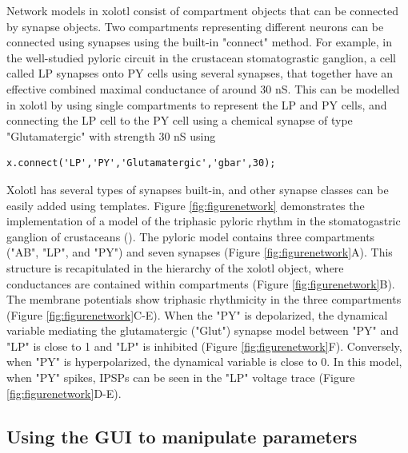 \documentclass{frontiersSCNS} %
\begin{document}
\begin{tcolorbox}[breakable,notitle,boxrule=0pt,colback=yellow,colframe=yellow]

Network models in xolotl consist of compartment objects that can be connected by synapse objects. Two compartments representing different neurons can be connected using synapses using the built-in "connect" method. For example, in the well-studied pyloric circuit in the crustacean stomatograstic ganglion, a cell called LP synapses onto PY cells using several synapses, that together have an effective combined maximal conductance of around 30 nS. This can be modelled in xolotl by using single compartments to represent the LP and PY cells, and connecting the LP cell to the PY cell using a chemical synapse of type "Glutamatergic" with strength 30 nS using

\end{tcolorbox}

\begin{lstlisting}[style=Matlab-editor]
x.connect('LP','PY','Glutamatergic','gbar',30);
\end{lstlisting}

Xolotl has several types of synapses built-in, and other synapse classes can be easily added using templates. Figure \ref{fig:figurenetwork} demonstrates the implementation of a model of the triphasic pyloric rhythm in the stomatogastric ganglion of crustaceans (\cite{prinzSimilarNetworkActivity2004}). The pyloric model contains three compartments ("AB", "LP", and "PY") and seven synapses (Figure \ref{fig:figurenetwork}A). This structure is recapitulated in the hierarchy of the xolotl object, where conductances are contained within compartments (Figure \ref{fig:figurenetwork}B). The membrane potentials show triphasic rhythmicity in the three compartments (Figure \ref{fig:figurenetwork}C-E). When the "PY" is depolarized, the dynamical variable mediating the  glutamatergic ("Glut") synapse model between "PY" and "LP" is close to 1 and "LP" is inhibited (Figure \ref{fig:figurenetwork}F). Conversely, when "PY" is hyperpolarized, the dynamical variable is close to 0. In this model, when "PY" spikes, IPSPs can be seen in the "LP" voltage trace (Figure \ref{fig:figurenetwork}D-E).



%
%
%
%
%
%

\subsection{Using the GUI to manipulate parameters}
\end{document}
